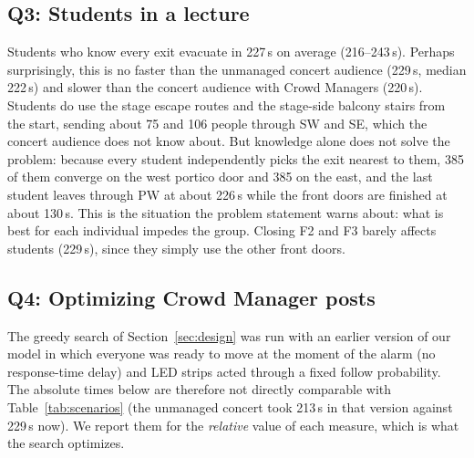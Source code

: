 \documentclass{article}
\begin{document}
\subsection{Q3: Students in a lecture}
Students who know every exit evacuate in 227\,s on average (216--243\,s). Perhaps surprisingly, this is no faster than the unmanaged concert audience (229\,s, median 222\,s) and slower than the concert audience with Crowd Managers (220\,s). Students do use the stage escape routes and the stage-side balcony stairs from the start, sending about 75 and 106 people through SW and SE, which the concert audience does not know about. But knowledge alone does not solve the problem: because every student independently picks the exit nearest to them, 385 of them converge on the west portico door and 385 on the east, and the last student leaves through PW at about 226\,s while the front doors are finished at about 130\,s. This is the situation the problem statement warns about: what is best for each individual impedes the group. Closing F2 and F3 barely affects students (229\,s), since they simply use the other front doors.

\subsection{Q4: Optimizing Crowd Manager posts}
\label{sec:opt_managers}
The greedy search of Section~\ref{sec:design} was run with an earlier version of our model in which everyone was ready to move at the moment of the alarm (no response-time delay) and LED strips acted through a fixed follow probability. The absolute times below are therefore not directly comparable with Table~\ref{tab:scenarios} (the unmanaged concert took 213\,s in that version against 229\,s now). We report them for the \emph{relative} value of each measure, which is what the search optimizes.
\end{document}
